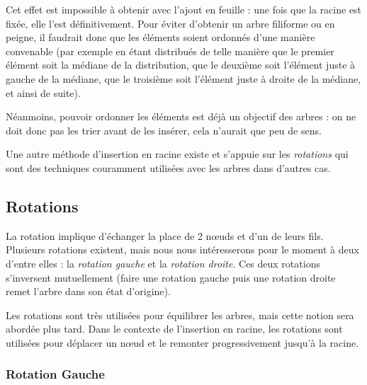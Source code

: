 \documentclass[11pt,a4paper]{article}
\begin{document}
\medskip

Cet effet est impossible à obtenir avec l'ajout en feuille : une fois que la racine est fixée, elle l'est définitivement.
Pour éviter d'obtenir un arbre filiforme ou en peigne, il faudrait donc que les éléments soient ordonnés d'une manière convenable (par exemple en étant distribués de telle manière que le premier élément soit la médiane de la distribution, que le deuxième soit l'élément juste à gauche de la médiane, que le troisième soit l'élément juste à droite de la médiane, et ainsi de suite).

Néanmoins, pouvoir ordonner les éléments est déjà un objectif des arbres : on ne doit donc pas les trier avant de les insérer, cela n'aurait que peu de sens.

\medskip

Une autre méthode d'insertion en racine existe et s'appuie sur les \textit{rotations} qui sont des techniques couramment utilisées avec les arbres dans d'autres cas.

\vfillFirst

\vfillLast


\clearpage


\subsection{Rotations}

La rotation implique d'échanger la place de 2 nœuds et d'un de leurs fils.
Plusieurs rotations existent, mais nous nous intéresserons pour le moment à deux d'entre elles : la \textit{rotation gauche} et la \textit{rotation droite}.
Ces deux rotations s'inversent mutuellement (faire une rotation gauche puis une rotation droite remet l'arbre dans son état d'origine).

\medskip

Les rotations sont très utilisées pour équilibrer les arbres, mais cette notion sera abordée plus tard.
Dans le contexte de l'insertion en racine, les rotations sont utilisées pour déplacer un nœud et le remonter progressivement jusqu'à la racine.

\medskip


\vfillFirst


\subsubsection{Rotation Gauche}
\end{document}
